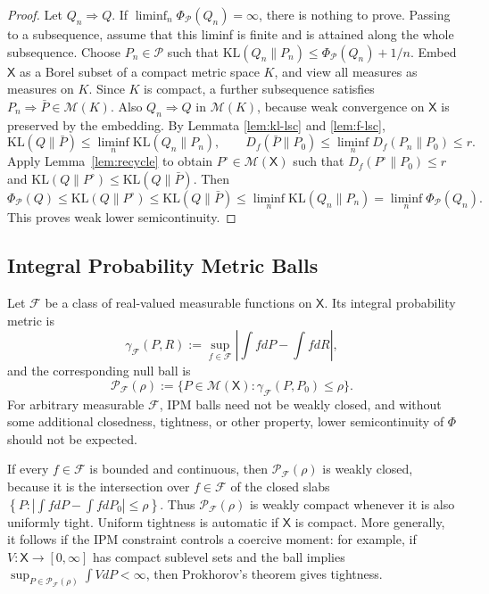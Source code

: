 \documentclass[11pt]{article}
\newcommand{\KL}{\mathrm{KL}}
\newcommand{\Pcal}{\mathcal{P}}
\newcommand{\Fcal}{\mathcal{F}}
\newcommand{\X}{\mathsf{X}}
\newcommand{\M}{\mathcal{M}}
\newcommand{\dd}{d}
\theoremstyle{definition}
\theoremstyle{definition}
\begin{document}
\begin{proof}
Let \(Q_n\Rightarrow Q\).  If \(\liminf_n\Phi_{\Pcal}(Q_n)=\infty\), there is nothing to prove.  Passing to a subsequence, assume that this liminf is finite and is attained along the whole subsequence.  Choose \(P_n\in\Pcal\) such that
\(
  \KL(Q_n\|P_n)\le \Phi_{\Pcal}(Q_n)+1/n.
\)
Embed \(\X\) as a Borel subset of a compact metric space \(K\), and view all measures as measures on \(K\).  Since \(K\) is compact, a further subsequence satisfies \(P_n\Rightarrow\bar P\in\M(K)\).  Also \(Q_n\Rightarrow Q\) in \(\M(K)\), because weak convergence on \(\X\) is preserved by the embedding.  By Lemmata \ref{lem:kl-lsc} and \ref{lem:f-lsc},
\[
  \KL(Q\|\bar P)
  \le \liminf_n\KL(Q_n\|P_n),
  \qquad
  D_f(\bar P\|P_0)
  \le \liminf_nD_f(P_n\|P_0)
  \le r.
\]
Apply Lemma~\ref{lem:recycle} to obtain \(P^\circ\in\M(\X)\) such that \(D_f(P^\circ\|P_0)\le r\) and \(\KL(Q\|P^\circ)\le\KL(Q\|\bar P)\).  Then
\[
  \Phi_{\Pcal}(Q)
  \le\KL(Q\|P^\circ)
  \le\KL(Q\|\bar P)
  \le\liminf_n\KL(Q_n\|P_n)
  =\liminf_n\Phi_{\Pcal}(Q_n).
\]
This proves weak lower semicontinuity.
\end{proof}

\subsection{Integral Probability Metric Balls}



Let \(\Fcal\) be a class of real-valued measurable functions on \(\X\).  Its integral probability metric is
\begin{equation}\label{eq:ipm}
  \gamma_{\Fcal}(P,R)
  :=\sup_{f\in\Fcal}\left|\int f\dd P-\int f\dd R\right|,
\end{equation}
and the corresponding null ball is
\begin{equation}\label{eq:ipm-ball}
  \Pcal_{\Fcal}(\rho)
  :=\{P\in\M(\X):\gamma_{\Fcal}(P,P_0)\le \rho\}.
\end{equation}
 For arbitrary measurable \(\Fcal\), IPM balls need not be weakly closed, and without some additional closedness, tightness, or other property, lower semicontinuity of \(\Phi\) should not be expected.

 If every \(f\in\Fcal\) is bounded and continuous, then \(\Pcal_{\Fcal}(\rho)\) is weakly closed, because it is the intersection over \(f\in\Fcal\) of the closed slabs
\(
  \left\{P:\left|\int f\dd P-\int f\dd P_0\right|\le\rho\right\}.
\)
Thus \(\Pcal_{\Fcal}(\rho)\) is weakly compact whenever it is also uniformly tight.  Uniform tightness is automatic if \(\X\) is compact.  More generally, it follows if the IPM constraint controls a coercive moment: for example, if \(V:\X\to[0,\infty]\) has compact sublevel sets and the ball implies \(\sup_{P\in\Pcal_{\Fcal}(\rho)}\int V\dd P<\infty\), then Prokhorov's theorem gives tightness.
\end{document}

